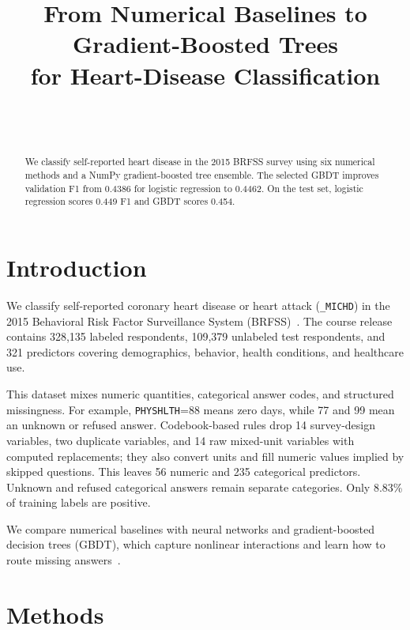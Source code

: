 \documentclass[10pt,conference,compsocconf]{IEEEtran}
\begin{document}
\title{From Numerical Baselines to Gradient-Boosted Trees\\
for Heart-Disease Classification}
\author{\paperauthors\\\paperaffiliation\\\papercontact}
\maketitle

\begin{abstract}
We classify self-reported heart disease in the 2015 BRFSS survey using
six numerical methods and a NumPy gradient-boosted tree ensemble. The
selected GBDT improves validation F1 from 0.4386 for logistic
regression to 0.4462. On the test set, logistic regression scores
0.449 F1 and GBDT scores 0.454.
\end{abstract}

\section{Introduction}

We classify self-reported coronary heart disease or heart attack
(\texttt{\_MICHD}) in the 2015 Behavioral Risk Factor Surveillance System
(BRFSS)~\cite{cdc2015}. The course release contains 328,135 labeled
respondents, 109,379 unlabeled test respondents, and 321 predictors
covering demographics, behavior, health conditions, and healthcare use.

This dataset mixes numeric quantities, categorical answer codes, and
structured missingness. For example, \texttt{PHYSHLTH}=88 means zero days,
while 77 and 99 mean an unknown or refused answer. Codebook-based rules drop
14 survey-design variables, two duplicate variables, and 14 raw mixed-unit
variables with computed replacements; they also convert units and fill
numeric values implied by skipped questions. This leaves 56 numeric and 235
categorical predictors. Unknown and refused categorical answers remain
separate categories. Only 8.83\% of training labels are positive.

We compare numerical baselines with neural networks and gradient-boosted
decision trees (GBDT), which capture nonlinear interactions and learn
how to route missing answers~\cite{chen2016xgboost,ke2017lightgbm}.

\section{Methods}
\end{document}

